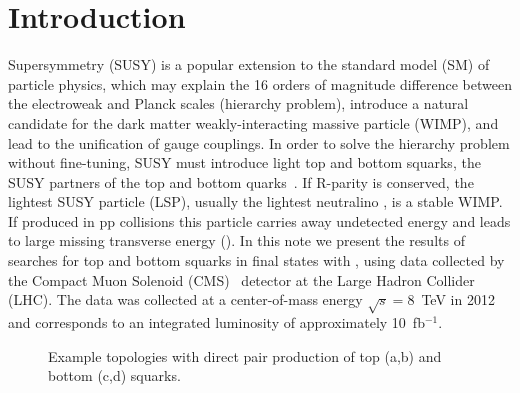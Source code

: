 \section{Introduction}
\label{sec:intro}

Supersymmetry (SUSY) is a popular extension to the standard model (SM) of particle physics, which may explain
the 16 orders of magnitude difference between the electroweak and Planck scales (hierarchy problem), introduce
a natural candidate for the dark matter weakly-interacting massive particle (WIMP), and lead to the unification of
gauge couplings.
In order to solve the hierarchy problem without fine-tuning, SUSY must introduce
light top and bottom squarks, the SUSY partners of the top and bottom quarks~\cite{ref:naturalsusy}.
If R-parity is conserved, the lightest SUSY particle (LSP),
usually the lightest neutralino \lsp, is a stable WIMP. If produced in pp collisions this
particle carries away undetected energy and leads to large missing transverse energy (\met).
In this note we present the results of searches for top and bottom squarks in final states with \met, 
using data collected by the Compact Muon Solenoid (CMS)~\cite{ref:CMS} detector at the
Large Hadron Collider (LHC). The data was collected at a center-of-mass energy $\sqrt{s}=8$~TeV in 2012
and corresponds to an integrated luminosity of approximately 10~fb$^{-1}$.

\begin{figure}
\begin{center}
\quad
{}\quad
{}
\caption{Example topologies with direct pair production of top (a,b) and bottom (c,d) squarks.
\label{fig:diagrams}
}
\end{center}
\end{figure}


